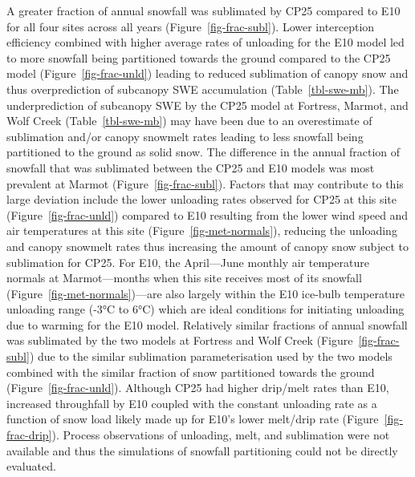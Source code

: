 \documentclass[
  letterpaper,
]{tex/uofsthesis-cs}
\begin{document}
A greater fraction of annual snowfall was sublimated by CP25 compared to
E10 for all four sites across all years (Figure~\ref{fig-frac-subl}).
Lower interception efficiency combined with higher average rates of
unloading for the E10 model led to more snowfall being partitioned
towards the ground compared to the CP25 model
(Figure~\ref{fig-frac-unld}) leading to reduced sublimation of canopy
snow and thus overprediction of subcanopy SWE accumulation
(Table~\ref{tbl-swe-mb}). The underprediction of subcanopy SWE by the
CP25 model at Fortress, Marmot, and Wolf Creek (Table~\ref{tbl-swe-mb})
may have been due to an overestimate of sublimation and/or canopy
snowmelt rates leading to less snowfall being partitioned to the ground
as solid snow. The difference in the annual fraction of snowfall that
was sublimated between the CP25 and E10 models was most prevalent at
Marmot (Figure~\ref{fig-frac-subl}). Factors that may contribute to this
large deviation include the lower unloading rates observed for CP25 at
this site (Figure~\ref{fig-frac-unld}) compared to E10 resulting from
the lower wind speed and air temperatures at this site
(Figure~\ref{fig-met-normals}), reducing the unloading and canopy
snowmelt rates thus increasing the amount of canopy snow subject to
sublimation for CP25. For E10, the April---June monthly air temperature
normals at Marmot---months when this site receives most of its snowfall
(Figure~\ref{fig-met-normals})---are also largely within the E10
ice-bulb temperature unloading range (-3°C to 6°C) which are ideal
conditions for initiating unloading due to warming for the E10 model.
Relatively similar fractions of annual snowfall was sublimated by the
two models at Fortress and Wolf Creek (Figure~\ref{fig-frac-subl}) due
to the similar sublimation parameterisation used by the two models
combined with the similar fraction of snow partitioned towards the
ground (Figure~\ref{fig-frac-unld}). Although CP25 had higher drip/melt
rates than E10, increased throughfall by E10 coupled with the constant
unloading rate as a function of snow load likely made up for E10's lower
melt/drip rate (Figure~\ref{fig-frac-drip}). Process observations of
unloading, melt, and sublimation were not available and thus the
simulations of snowfall partitioning could not be directly evaluated.
\end{document}
